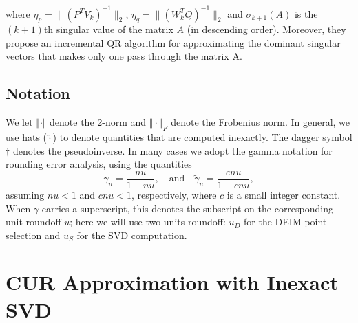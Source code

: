 \documentclass[12pt, a4paper]{article}
\def\norm#1{\|#1\|}
\theoremstyle{remark}
\begin{document}
where $\eta_p = \norm{(P^TV_k)^{-1}}_2$, $\eta_q = \norm{(W_k^TQ)^{-1}}_2$ and $\sigma_{k+1}(A)$ is the $(k+1)$th singular value of the matrix $A$ (in descending order). Moreover, they propose an incremental QR algorithm for approximating the dominant singular vectors that makes only one pass through the matrix A.  
\begin{algorithm}%
    \caption{DEIM point selection algorithm}\label{alg:DEIM}
\end{algorithm}

\subsection{Notation}
\hspace{5mm}We let $\Vert \cdot \Vert$ denote the 2-norm and $\Vert \cdot \Vert_F$ denote the Frobenius norm. In general, we use hats ($\hat{\cdot}$) to denote quantities that are computed inexactly. The dagger symbol $\dagger$ denotes the pseudoinverse. In many cases we adopt the gamma notation for rounding error analysis, using the quantities
\[
\gamma_n = \frac{nu}{1-nu},\quad\text{and}\quad \widetilde{\gamma}_n = \frac{cnu}{1-cnu},
\]
assuming $nu<1$ and $cnu<1$, respectively, where $c$ is a small integer constant. When $\gamma$ carries a superscript, this denotes the subscript on the corresponding unit roundoff $u$; here we will use two units roundoff: $u_D$ for the DEIM point selection and $u_S$ for the SVD computation. 
\section{CUR Approximation with Inexact SVD}
\label{sec:inexactSVD}
\end{document}
